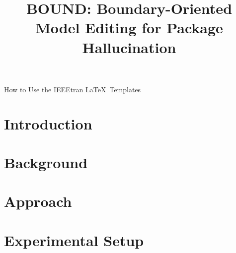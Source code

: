 \documentclass[10pt,conference]{IEEEtran}
\begin{document}

\SimpleModetrue

\title{BOUND: Boundary-Oriented Model Editing for Package Hallucination}



%
{How to Use the IEEEtran \LaTeX \ Templates}

\maketitle

\begin{abstract}

\end{abstract}



\section{Introduction}


\section{Background}
\label{sec:background}


\section{Approach}
\label{sec:approach}


\section{Experimental Setup}
\label{sec:experimentalsetup}

\end{document}
